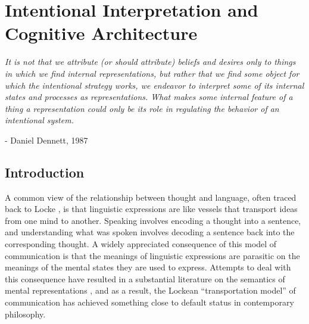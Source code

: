 
\chapter{Intentional Interpretation and Cognitive Architecture}
\renewcommand{\epigraphrule}{0pt}
\setlength{\epigraphwidth}{4.5in}
\epigraph{\textit{It is not that we attribute (or should attribute) beliefs and desires only to things in which we find internal representations, but rather that we find some object for which the intentional strategy works, we endeavor to interpret some of its internal states and processes as representations. What makes some internal feature of a thing a representation could only be its role in regulating the behavior of an intentional system.}}{- Daniel Dennett, 1987}

\section{Introduction}

A common view of the relationship between thought and language, often traced back to Locke \citep{Brandom:1994,KortaPerry:2015}, is that linguistic expressions are like vessels that transport ideas from one mind to another. Speaking involves encoding a thought into a sentence, and understanding what was spoken involves decoding a sentence back into the corresponding thought. A widely appreciated consequence of this model of communication is that the meanings of linguistic expressions are parasitic on the meanings of the mental states they are used to express. Attempts to deal with this consequence have resulted in a substantial literature on the semantics of mental representations \citep[e.g.,][]{Fodor:1998,Fodor:1987,Block:1986,Harman:1982}, and as a result, the Lockean ``transportation model'' of communication has achieved something close to default status in contemporary philosophy. 

